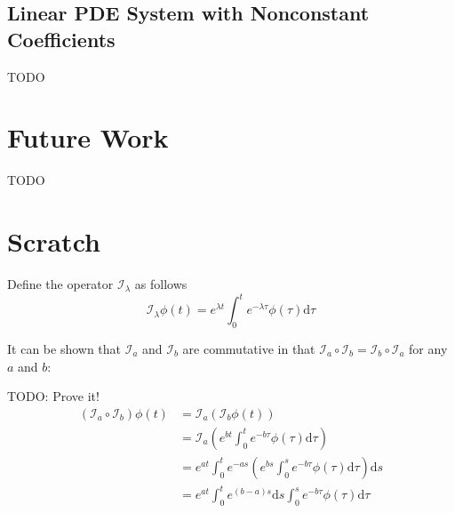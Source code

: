 \documentclass[accepted]{uai2023}
\newcommand{\I}{\mathcal{I}}
\begin{document}
\subsection{Linear PDE System with Nonconstant Coefficients } \label{section:experiment-attractor}
    TODO

\section{Future Work}
    TODO


\appendix

\section*{Scratch}
    Define the operator $\I_\lambda$ as follows
    \begin{equation}
        \I_\lambda \phi(t) = e^{\lambda t} \int_{0}^{t} e^{-\lambda \tau} \phi(\tau) \mathrm{d}\tau
    \end{equation}

    It can be shown that $\I_a$ and $\I_b$ are commutative in that $\I_a \circ \I_b = \I_b \circ \I_a$ for any $a$ and $b$:

    TODO: Prove it!
    \begin{align}
        \left(\I_a \circ \I_b\right) \phi (t) &= \I_a \left(\I_b \phi(t) \right) \\
        &= \I_a \left(e^{bt} \int_{0}^{t} e^{-b\tau} \phi(\tau) \mathrm{d} \tau\right) \\
        &= e^{at}\int_{0}^{t}e^{-as} \left(e^{bs} \int_{0}^{s} e^{-b\tau} \phi(\tau) \mathrm{d} \tau\right)\mathrm{d}s \\
        &= e^{at}\int_{0}^{t}e^{(b-a)s} \mathrm{d}s \int_{0}^{s} e^{-b\tau} \phi(\tau) \mathrm{d} \tau \\
    \end{align}
\end{document}

